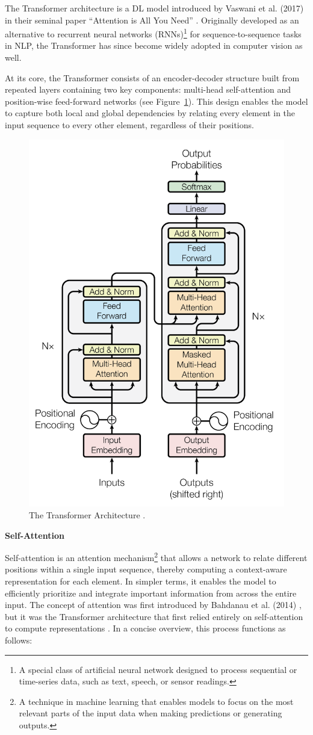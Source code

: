 \documentclass[a4paper,10pt]{book}
\begin{document}
The Transformer architecture is a DL model introduced by Vaswani et al. (2017) in their seminal paper “Attention is All You Need” \cite{vaswani_attention_2017}. Originally developed as an alternative to recurrent neural networks (RNNs)\footnote{A special class of artificial neural network designed to process sequential or time-series data, such as text, speech, or sensor readings.} for sequence-to-sequence tasks in NLP, the Transformer has since become widely adopted in computer vision as well.

At its core, the Transformer consists of an encoder-decoder structure built from repeated layers containing two key components: multi-head self-attention and position-wise feed-forward networks (see Figure~\ref{fig:transformer}). This design enables the model to capture both local and global dependencies by relating every element in the input sequence to every other element, regardless of their positions.

\begin{figure}[h!]
    \centering
    \includegraphics[width=0.5\linewidth]{reports//assets/transformer.png}
    \caption[Transformer Architecture]{The Transformer Architecture \cite{vaswani_attention_2017}.}
    \label{fig:transformer}
\end{figure}

\textbf{Self-Attention}

Self-attention is an attention mechanism\footnote{A technique in machine learning that enables models to focus on the most relevant parts of the input data when making predictions or generating outputs.} that allows a network to relate different positions within a single input sequence, thereby computing a context-aware representation for each element. In simpler terms, it enables the model to efficiently prioritize and integrate important information from across the entire input. The concept of attention was first introduced by Bahdanau et al. (2014) \cite{bahdanau_neural_2014}, but it was the Transformer architecture that first relied entirely on self-attention to compute representations \cite{vaswani_attention_2017}. In a concise overview, this process functions as follows:
\end{document}
